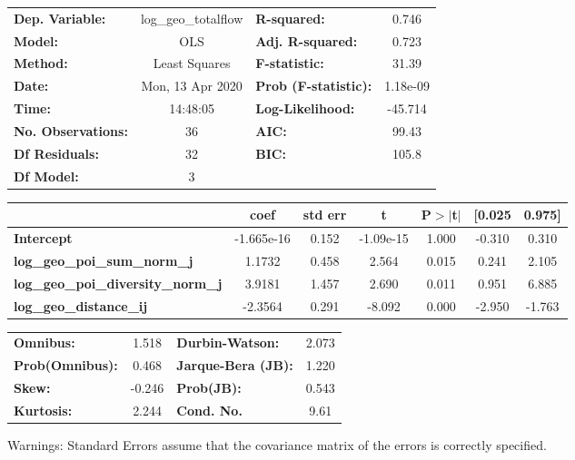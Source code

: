 \begin{center}
\begin{tabular}{lclc}
\toprule
\textbf{Dep. Variable:}                    & log\_geo\_totalflow & \textbf{  R-squared:         } &     0.746   \\
\textbf{Model:}                            &         OLS         & \textbf{  Adj. R-squared:    } &     0.723   \\
\textbf{Method:}                           &    Least Squares    & \textbf{  F-statistic:       } &     31.39   \\
\textbf{Date:}                             &   Mon, 13 Apr 2020  & \textbf{  Prob (F-statistic):} &  1.18e-09   \\
\textbf{Time:}                             &       14:48:05      & \textbf{  Log-Likelihood:    } &   -45.714   \\
\textbf{No. Observations:}                 &            36       & \textbf{  AIC:               } &     99.43   \\
\textbf{Df Residuals:}                     &            32       & \textbf{  BIC:               } &     105.8   \\
\textbf{Df Model:}                         &             3       & \textbf{                     } &             \\
\bottomrule
\end{tabular}
\begin{tabular}{lcccccc}
                                           & \textbf{coef} & \textbf{std err} & \textbf{t} & \textbf{P$> |$t$|$} & \textbf{[0.025} & \textbf{0.975]}  \\
\midrule
\textbf{Intercept}                         &   -1.665e-16  &        0.152     & -1.09e-15  &         1.000        &       -0.310    &        0.310     \\
\textbf{log\_geo\_poi\_sum\_norm\_j}       &       1.1732  &        0.458     &     2.564  &         0.015        &        0.241    &        2.105     \\
\textbf{log\_geo\_poi\_diversity\_norm\_j} &       3.9181  &        1.457     &     2.690  &         0.011        &        0.951    &        6.885     \\
\textbf{log\_geo\_distance\_ij}            &      -2.3564  &        0.291     &    -8.092  &         0.000        &       -2.950    &       -1.763     \\
\bottomrule
\end{tabular}
\begin{tabular}{lclc}
\textbf{Omnibus:}       &  1.518 & \textbf{  Durbin-Watson:     } &    2.073  \\
\textbf{Prob(Omnibus):} &  0.468 & \textbf{  Jarque-Bera (JB):  } &    1.220  \\
\textbf{Skew:}          & -0.246 & \textbf{  Prob(JB):          } &    0.543  \\
\textbf{Kurtosis:}      &  2.244 & \textbf{  Cond. No.          } &     9.61  \\
\bottomrule
\end{tabular}
\end{center}

Warnings: \newline
 [1] Standard Errors assume that the covariance matrix of the errors is correctly specified.